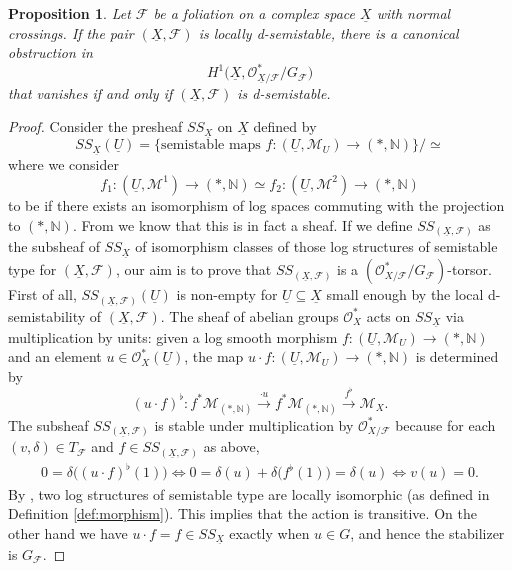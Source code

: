 \documentclass[reqno]{amsart}
\newcommand\N{\mathbb{N}}
\newcommand{\OO}{\mathcal{O}}
\newcommand{\F}{\mathscr{F}}
\newcommand{\M}{\mathcal{M}}
\newtheorem{proposition}[theorem]{Proposition}
\theoremstyle{definition}
\theoremstyle{named}
\begin{document}
\begin{proposition}\label{global_obs_semistability}
Let $\F$ be a foliation on a complex space $\underline{X}$ with normal crossings. If the pair $(\underline{X},\F)$ is locally d-semistable, there is a canonical obstruction in $$H^1\big(\underline{X},\OO^*_{\underline{X}/\F}/G_\F\big)$$ that vanishes if and only if $(\underline{X},\F)$ is d-semistable.
\end{proposition}
\begin{proof}
Consider the presheaf $SS_{\underline{X}}$ on $\underline{X}$ defined by
$$SS_{\underline{X}}(\underline{U}) = \big\{\text{semistable maps }f:(\underline{U},\M_{U})\rightarrow (\ast,\N)\big\}/\simeq$$
where we consider 
$$f_1:(\underline{U},\M^1)\to (\ast,\N) \simeq f_2:(\underline{U},\M^2)\to (\ast,\N)$$ to be if there exists an isomorphism of log spaces commuting with the projection to $(\ast, \N)$.
From \cite[page 424]{olsson2003universal} we know that this is in fact a sheaf. If we define $SS_{(\underline{X},\F)}$ as the subsheaf of $SS_{\underline{X}}$ of isomorphism classes of those log structures of semistable type for $(\underline{X},\F)$, our aim is to prove that $SS_{(\underline{X},\F)}$ is a $(\OO_{X/\F}^\ast/G_\F)$-torsor. First of all, $SS_{(\underline{X},\F)}(\underline{U})$ is non-empty for $\underline{U}\subseteq \underline{X}$ small enough by the local d-semistability of $(\underline{X},\F)$. The sheaf of abelian groups $\OO_{X}^\ast$ acts on $SS_{\underline{X}}$ via multiplication by units: given a log smooth morphism $f:(\underline{U},\M_U)\rightarrow (\ast,\N)$ and an element $u\in \OO_X^\ast(\underline{U})$, the map $u\cdot f:(\underline{U},\M_U)\rightarrow (\ast,\N)$ is determined by
$$(u\cdot f)^\flat: f^*\M_{(\ast, \N)}\xrightarrow{\cdot u} f^*\M_{(\ast, \N)} \xrightarrow{f^\flat} \M_X.$$
The subsheaf $SS_{(\underline{X},\F)}$ is stable under multiplication by $\OO_{X/\F}^\ast$ because for each $(v,\delta)\in T_\F$ and $f\in SS_{(\underline{X},\F)}$ as above,
\begin{align*}
    0 = \delta\big((u\cdot f)^\flat(1)\big) \iff 0 = \delta(u) + \delta\big(f^\flat(1)\big) = \delta(u) \iff v(u) = 0.
\end{align*}
By \cite[Proposition 3.8]{olsson2003universal}, two log structures of semistable type are locally isomorphic (as defined in Definition \ref{def:morphism}). This implies that the action is transitive. On the other hand we have $u\cdot f = f\in SS_{\underline{X}}$ exactly when $u\in G$, and hence the stabilizer is $G_\F$. 
\end{proof}
\end{document}
